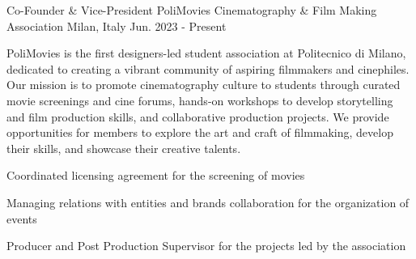 

\begin{cventries}

\cventry
{Co-Founder \& Vice-President} %
{PoliMovies Cinematography \& Film Making Association} %
{Milan, Italy} %
{Jun. 2023 - Present} %
{
  \begin{cvitems} %
    {PoliMovies is the first designers-led student association at Politecnico di Milano, \\dedicated to creating a vibrant community of aspiring filmmakers and cinephiles. \\Our mission is to promote cinematography culture to students through curated movie screenings and cine forums, hands-on workshops to develop storytelling and film production skills, and collaborative production projects. We provide opportunities for members to explore the art and craft of filmmaking, develop their skills, and showcase their creative talents.}
    \item {}
    \item {Coordinated licensing agreement for the screening of movies}
    \item {Managing relations with entities and brands collaboration for the organization of events}
    \item {Producer and Post Production Supervisor for the projects led by the association}
  \end{cvitems}
}

\end{cventries}
